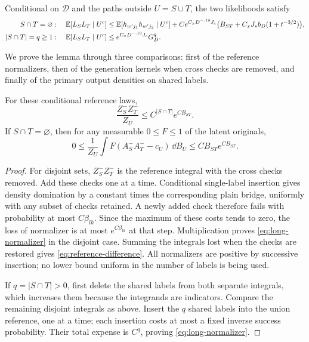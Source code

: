 \begin{lemma}\label{lem:long-product}
Conditional on $\mathcal D$ and the paths outside $U=S\cup T$,
the two likelihoods satisfy
\begin{align}
 S\cap T=\varnothing:\quad
 \mathbb E[L_SL_T\mid U^c]
 &\le \mathbb E[h_{w'j_1}h_{w'j_2}\mid U^c]
   +Ce^{C_xD^{-.19}J_c}
       \bigl(B_{ST}+C_xJ_*b_D(1+t^{-3/2})\bigr),
       \label{eq:long-product}\\
 |S\cap T|=q\ge1:\quad
 \mathbb E[L_SL_T\mid U^c]
 &\le e^{C_xD^{-.19}J_c}G_D^q.
       \label{eq:long-product-overlap}
\end{align}
\end{lemma}

We prove the lemma through three comparisons: first of the reference
normalizers, then of the generation kernels when cross checks are
removed, and finally of the primary output densities on shared labels.

\begin{lemma}\label{lem:normalizer-comparison}
For these conditional reference laws,
\begin{equation}\label{eq:long-normalizer}
 \frac{Z_S^-Z_T^-}{Z_U}
       \le C^{|S\cap T|}e^{CB_{ST}}.
\end{equation}
If $S\cap T=\varnothing$, then for any measurable $0\le F\le1$
of the latent originals,
\begin{equation}\label{eq:reference-difference}
 0\le \frac1{Z_U}\int F(A_S^-A_T^--c_U)\,\dd B_U
          \le CB_{ST}e^{CB_{ST}}.
\end{equation}
\end{lemma}
\begin{proof}
For disjoint sets, $Z_S^-Z_T^-$ is the reference integral with
the cross checks removed.  Add these checks one at a time.
Conditional single-label insertion gives density domination by a
constant times the corresponding plain bridge, uniformly with any
subset of checks retained.  A newly added check therefore fails
with probability at most $C\beta_{lk}$.  Since the maximum of these
costs tends to zero, the loss of normalizer is at most
$e^{C\beta_{lk}}$ at that step.  Multiplication proves
\eqref{eq:long-normalizer} in the disjoint case.  Summing the
integrals lost when the checks are restored gives
\eqref{eq:reference-difference}.  All normalizers are positive by
successive insertion; no lower bound uniform in the number of
labels is being used.

If $q=|S\cap T|>0$, first delete the shared labels from both
separate integrals, which increases them because the integrands
are indicators.  Compare the remaining disjoint integrals as
above.  Insert the $q$ shared labels into the union reference,
one at a time; each insertion costs at most a fixed inverse
success probability.  Their total expense is $C^q$, proving
\eqref{eq:long-normalizer}.
\end{proof}

